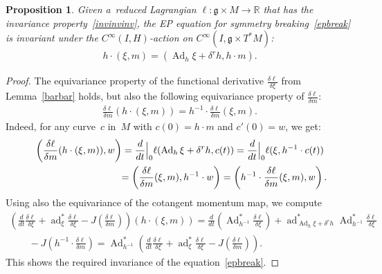 \documentclass[10pt,a4paper]{amsart}
\numberwithin{equation}{section}
\newtheorem{Proposition}[Theorem]{Proposition}
{ \theoremstyle{definition}
\newtheorem{Example}[Theorem]{Example}
\newtheorem{Remark}[Theorem]{Remark} }
\begin{document}
\begin{Proposition}
\label{thmb}
Given a~reduced Lagrangian $\ell:\mathfrak g\times M\to\mathbb R$ that has the invariance pro\-per\-ty~\eqref{invinvinv},
the EP equation for symmetry breaking~\eqref{epbreak} is invariant under the $C^{\infty}(I,H)$-action on
$C^{\infty}(I,\mathfrak g\times T^*M)$:
\begin{gather*}
h\cdot (\xi,m)=(\operatorname{Ad}_h\xi+\delta^rh,{h}\cdot m).
\end{gather*}
\end{Proposition}

\begin{proof}
The equivariance property of the functional derivative $\frac{\delta\ell}{\delta\xi}$ from Lemma~\ref{barbar} holds, but
also the following equivariance property of $\frac{\delta\ell}{\delta m}$:
\begin{gather*}
\frac{\delta\ell}{\delta m}(h\cdot(\xi, m))={h^{-1}}\cdot\frac{\delta \ell}{\delta m}(\xi,m).
\end{gather*}
Indeed, for any curve~$c$ in~$M$ with $c(0)=h\cdot m$ and $c'(0)=w$, we get:
\begin{gather*}
\left(\frac{\delta\ell}{\delta m}(h\cdot(\xi,m)),w\right)
=\frac{d}{dt}\Big|_0\ell(\operatorname{Ad}_h\xi+\delta^rh,c(t)) =\frac{d}{dt}\Big|_0\ell(\xi,h^{-1}\cdot c(t))
\\
\hphantom{\left(\frac{\delta\ell}{\delta m}(h\cdot(\xi,m)),w\right)}{}
=\left(\frac{\delta\ell}{\delta m}(\xi,m),h^{-1}\cdot w\right) =\left(h^{-1}\cdot\frac{\delta\ell}{\delta
m}(\xi,m),w\right).
\end{gather*}
Using also the equivariance of the cotangent momentum map, we compute
\begin{gather*}
\left(\frac{d}{dt}\frac{\delta\ell}{\delta\xi}+\operatorname{ad}^*_\xi\frac{\delta
\ell}{\delta\xi}-J\left(\frac{\delta\ell}{\delta m}\right)\right)(h\cdot (\xi,m))
 =\frac{d}{dt}\left(\operatorname{Ad}^*_{h^{-1}}\frac{\delta \ell}{\delta\xi}\right)
+\operatorname{ad}^*_{\operatorname{Ad}_h\xi+\delta^rh}\operatorname{Ad}^*_{h^{-1}}\frac{\delta\ell}{\delta\xi}
\\
\qquad
{}-J\left(h^{-1}\cdot\frac{\delta\ell}{\delta
m}\right) =\operatorname{Ad}^*_{h^{-1}}\left(\frac{d}{dt}\frac{\delta\ell}{\delta\xi}+\operatorname{ad}^*_\xi\frac{\delta
\ell}{\delta\xi}-J\left(\frac{\delta\ell}{\delta m}\right)\right).
\end{gather*}
This shows the required invariance of the equation~\eqref{epbreak}.
\end{proof}
\end{document}
